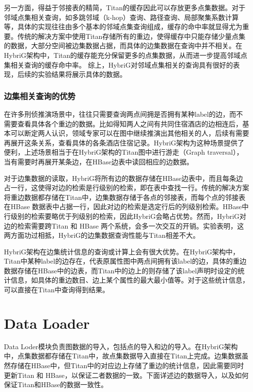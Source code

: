 另一方面，得益于邻接表的精简，Titan的缓存因此可以存放更多点集数据。对于邻域点集相关查询，如多跳邻域（k-hop）查询、路径查询、局部聚集系数计算等，具体的实现往往由多个基本的邻域点集查询组成，缓存的命中率就显得尤为重要。传统的解决方案中使用Titan存储所有的重边，使得缓存中只能存储少量点集的数据，大部分空间被边集数据占据，而具体的边集数据在查询中并不相关。在HybriG架构中，Titan的缓存能充分保留更多的点集数据，从而进一步提高邻域点集相关查询的缓存命中率。
综上，HybriG对邻域点集相关的查询具有很好的表现，后续的实验结果将展示具体的数据。

\subsubsection{边集相关查询的优势}
在许多刑侦推演场景中，往往只需要查询两点间拥是否拥有某种label的边，而不需要查看具体各个重边的数据。比如得知两人之间有共同住宿酒店的边相连后，基本可以断定两人认识，领域专家可以在图中继续推演出其他相关的人，后续有需要再展开这条关系，查看具体的各条酒店住宿记录。HybriG架构为这种场景提供了便利，上述场景相当于在HybriG架构的Titan图中进行游走（Graph traversal），当有需要时再展开某条边，在HBase边表中读回相应的边数据。

对于边集数据的读取，HybriG将所有边的数据存储在HBase边表中，而且每条边占一行，这使得对边的检索是行级别的检索，即在表中查找一行。传统的解决方案将重边数据都存储在Titan中，边集数据存储于各点的邻接表，而每个点的邻接表在HBase 数据表中占据一行，因此对边的检索是选定行后的列级别检索。HBase中行级别的检索要略优于列级别的检索，因此HybriG会略占优势。然而，HybriG对边的检索需要跨Titan 和 HBase 两个系统，会多一次交互的开销。实验表明，这两方面功过相抵，HybriG的边集数据查询性能与Titan相差不大。

HybriG架构在边集统计信息的查询或计算上会有很大优势。在HybriG架构中，Titan中某种label的边存在，代表原属性图中两点间拥有该label的边，具体的重边数据存储在HBase中的边表，而Titan中的边上的则存储了该label声明时设定的统计信息，如具体的重边数目、边上某个属性的最大最小值等。对于这些统计信息，可以直接在Titan中查询得到结果。


\section{Data Loader}
Data Loder模块负责图数据的导入，包括点的导入和边的导入。在HybriG架构中，点集数据都存储在Titan中，故点集数据导入直接在Titan上完成。边集数据虽然存储在HBase中，但Titan中的对应边上存储了重边的统计信息，因此需要同时更新Titan 和 HBase，以保证二者数据的一致。下面详述边的数据导入，以及如何保证Titan和HBase的数据一致性。

